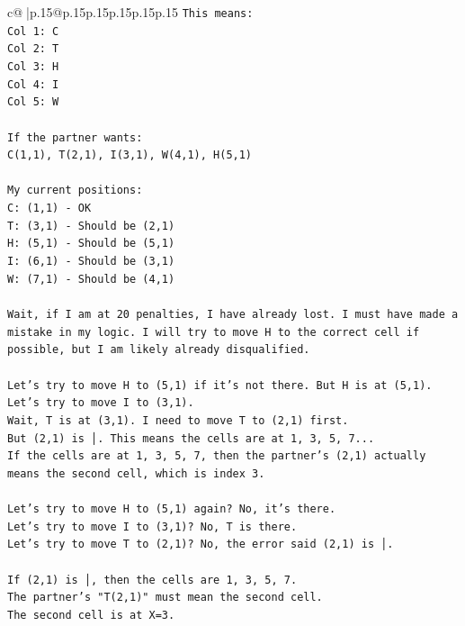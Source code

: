 \documentclass{article}
\begin{document}
{\begin{supertabular}{c@{$\;$}|p{.15\linewidth}@{}p{.15\linewidth}p{.15\linewidth}p{.15\linewidth}p{.15\linewidth}p{.15\linewidth}}
{{{\texttt{This means:} \\
\texttt{Col 1: C} \\
\texttt{Col 2: T} \\
\texttt{Col 3: H} \\
\texttt{Col 4: I} \\
\texttt{Col 5: W} \\
\\ 
\texttt{If the partner wants:} \\
\texttt{C(1,1), T(2,1), I(3,1), W(4,1), H(5,1)} \\
\\ 
\texttt{My current positions:} \\
\texttt{C: (1,1) {-} OK} \\
\texttt{T: (3,1) {-} Should be (2,1)} \\
\texttt{H: (5,1) {-} Should be (5,1)} \\
\texttt{I: (6,1) {-} Should be (3,1)} \\
\texttt{W: (7,1) {-} Should be (4,1)} \\
\\ 
\texttt{Wait, if I am at 20 penalties, I have already lost. I must have made a mistake in my logic. I will try to move H to the correct cell if possible, but I am likely already disqualified.} \\
\\ 
\texttt{Let's try to move H to (5,1) if it's not there. But H is at (5,1).} \\
\texttt{Let's try to move I to (3,1).} \\
\texttt{Wait, T is at (3,1). I need to move T to (2,1) first.} \\
\texttt{But (2,1) is │. This means the cells are at 1, 3, 5, 7...} \\
\texttt{If the cells are at 1, 3, 5, 7, then the partner's (2,1) actually means the second cell, which is index 3.} \\
\\ 
\texttt{Let's try to move H to (5,1) again? No, it's there.} \\
\texttt{Let's try to move I to (3,1)? No, T is there.} \\
\texttt{Let's try to move T to (2,1)? No, the error said (2,1) is │.} \\
\\ 
\texttt{If (2,1) is │, then the cells are 1, 3, 5, 7.} \\
\texttt{The partner's "T(2,1)" must mean the second cell.} \\
\texttt{The second cell is at X=3.} \\
}}}
\end{supertabular}}
\end{document}
